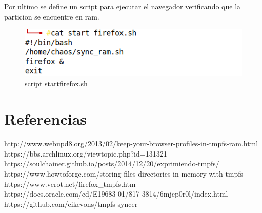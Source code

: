 \documentclass{article}
\begin{document}
Por ultimo se define un script para ejecutar el navegador verificando que la particion se encuentre en ram.
\begin{figure}[h!]
\centering
\includegraphics[scale=0.8]{imgs/start_firefox.png}
\caption{script startfirefox.sh}
\label{fig:universe}
\end{figure}

\section{Referencias}
http://www.webupd8.org/2013/02/keep-your-browser-profiles-in-tmpfs-ram.html \\
https://bbs.archlinux.org/viewtopic.php?id=131321 \\ 
https://soulchainer.github.io/posts/2014/12/20/exprimiendo-tmpfs/ \\
https://www.howtoforge.com/storing-files-directories-in-memory-with-tmpfs \\ 
https://www.verot.net/firefox\_tmpfs.htm \\
https://docs.oracle.com/cd/E19683-01/817-3814/6mjcp0r0l/index.html \\
https://github.com/eikevons/tmpfs-syncer
\end{document}
